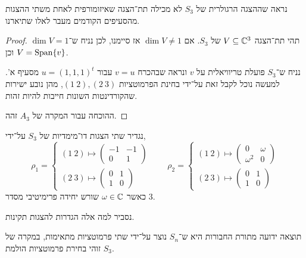 \subquestion{}
נראה שההצגה הרגולרית של $S_3$ לא מכילה תת־הצגה שאיזומורפית לאחת משתי ההצגות מהסעיפים הקודמים מעבר לאלו שתיארנו.
\begin{proof}
	תהי תת־הצגה $V \subseteq \mathbb{C}^3$ של $S_3$.
	אם $\dim V \ne 1$ אז סיימנו, לכן נניח ש־$\dim V = 1$ וכן $V = \operatorname{Span}\{ v \}$.

	נניח ש־$S_3$ פועלת טריוויאלית על $v$ ונראה שבהכרח $v = u$ עבור $u = {(1, 1, 1)}^t$ מסעיף א'.
	למעשה נוכל לקבל זאת על־ידי בחינת הפרמוטציות $(1\ 2), (2\ 3)$, מהן נובע ישירות שהקורדינטות השונות חייבות להיות זהות.

	ההוכחה עבור המקרה של $A_3$ זהה.
\end{proof}

\question{}
נגדיר שתי הצגות דו־מימדיות של $S_3$ על־ידי,
\[
	\rho_1
	= \begin{cases}
		(1\ 2) \mapsto
		\begin{pmatrix}
			-1 & -1 \\
			0 & 1
		\end{pmatrix} \\
		(2\ 3) \mapsto
		\begin{pmatrix}
			0 & 1 \\
			1 & 0
		\end{pmatrix}
	\end{cases}
	\qquad
	\rho_2
	= \begin{cases}
		(1\ 2) \mapsto
		\begin{pmatrix}
			0 & \omega \\
			\omega^2 & 0
		\end{pmatrix} \\
		(2\ 3) \mapsto
		\begin{pmatrix}
			0 & 1 \\
			1 & 0
		\end{pmatrix}
	\end{cases}
\]
כאשר $\omega \in \mathbb{C}$ שורש יחידה פרימיטיבי מסדר $3$.

\subquestion{}
נסביר למה אלה הגדרות להצגות תקינות.
\begin{solution}
	תוצאה ידועה מתורת החבורות היא ש־$S_n$ נוצר על־ידי שתי פרמוטציות מתאימות,
	במקרה של $S_3$ זוהי בחירת פרמוטציות הולמת.
\end{solution}

